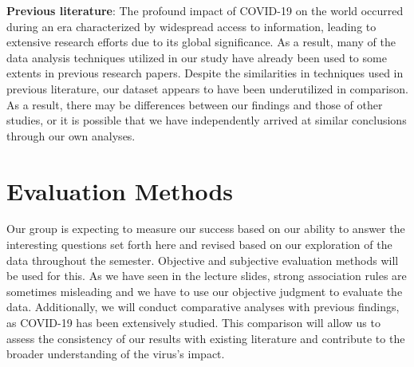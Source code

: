 \documentclass[manuscript,screen,review]{acmart}
\begin{document}
\textbf{Previous literature}: The profound impact of COVID-19 on the world occurred during an era characterized by widespread access to information, leading to extensive research efforts due to its global significance. As a result, many of the data analysis techniques utilized in our study have already been used to some extents in previous research papers. Despite the similarities in techniques used in previous literature, our dataset appears to have been underutilized in comparison. As a result, there may be differences between our findings and those of other studies, or it is possible that we have independently arrived at similar conclusions through our own analyses. 

\section{Evaluation Methods}
Our group is expecting to measure our success based on our ability to answer the interesting questions set forth here and revised based on our exploration of the data throughout the semester. Objective and subjective evaluation methods will be used for this. As we have seen in the lecture slides, strong association rules are sometimes misleading and we have to use our objective judgment to evaluate the data. Additionally, we will conduct comparative analyses with previous findings, as COVID-19 has been extensively studied. This comparison will allow us to assess the consistency of our results with existing literature and contribute to the broader understanding of the virus's impact.
\end{document}
